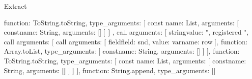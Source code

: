 \begin{lexlean}{Extract}
\begin{toolingmodule}
{{{{{{{{{{{{{{{{                                                  function: ToString.toString,
                                                  type_arguments: [
                                                    const{
                                                      name: List,
                                                      arguments: [
                                                        const{name: String, arguments: []}
                                                      ]
                                                    }
                                                  ]
                                                },
                                                call{
                                                  arguments: [
                                                    string{value: ", registered "},
                                                    call{
                                                      arguments: [
                                                        call{
                                                          arguments: [
                                                            field{field: snd, value: var{name: row}}
                                                          ],
                                                          function: Array.toList,
                                                          type_arguments: [
                                                            const{name: String, arguments: []}
                                                          ]
                                                        }
                                                      ],
                                                      function: ToString.toString,
                                                      type_arguments: [
                                                        const{
                                                          name: List,
                                                          arguments: [
                                                            const{name: String, arguments: []}
                                                          ]
                                                        }
                                                      ]
                                                    }
                                                  ],
                                                  function: String.append,
                                                  type_arguments: []
                                                }
}}}}}}}}}}}}}}}
\end{toolingmodule}
\end{lexlean}
